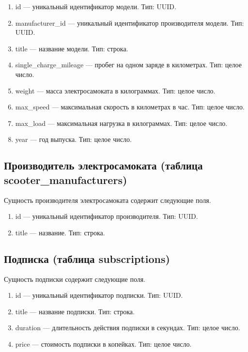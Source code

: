 \begin{enumerate}
	\item id --- уникальный идентификатор модели. Тип: UUID.
	\item manufacturer\_id --- уникальный идентификатор производителя модели. Тип: UUID.
	\item title --- название модели. Тип: строка.
	\item single\_charge\_mileage --- пробег на одном заряде в километрах. Тип: целое
	      число.
	\item weight --- масса электросамоката в килограммах. Тип: целое число.
	\item max\_speed --- максимальная скорость в километрах в час. Тип: целое число.
	\item max\_load --- максимальная нагрузка в килограммах. Тип: целое число.
	\item year --- год выпуска. Тип: целое число.
\end{enumerate}

\subsection{Производитель электросамоката (таблица scooter\_manufacturers)}

Сущность производителя электросамоката содержит следующие поля.

\begin{enumerate}
	\item id --- уникальный идентификатор производителя. Тип: UUID.
	\item title --- название. Тип: строка.
\end{enumerate}

\subsection{Подписка (таблица subscriptions)}

Сущность подписки содержит следующие поля.

\begin{enumerate}
	\item id --- уникальный идентификатор подписки. Тип: UUID.
	\item title --- название подписки. Тип: строка.
	\item duration --- длительность действия подписки в секундах. Тип: целое число.
	\item price --- стоимость подписки в копейках. Тип: целое число.
\end{enumerate}

